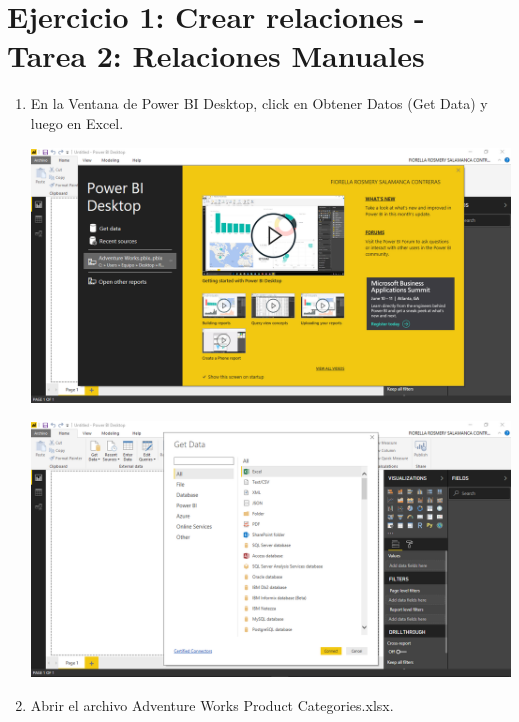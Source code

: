 \section{Ejercicio 1: Crear relaciones - Tarea 2: Relaciones Manuales} 


\begin{enumerate}[1.]

    \item En la Ventana de Power BI Desktop, click en Obtener Datos (Get Data) y luego en Excel.

	\begin{center}
	\includegraphics[width=17cm]{./Imagenes/Ejercicio1-Tarea2/1}
	\end{center}	

	\begin{center}
	\includegraphics[width=17cm]{./Imagenes/Ejercicio1-Tarea2/2}
	\end{center}	

    \item Abrir el archivo Adventure Works Product Categories.xlsx.


\end{enumerate}
